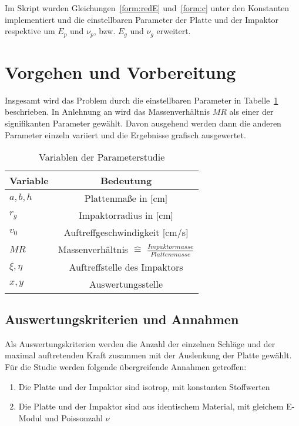 Im Skript wurden Gleichungen~\ref{form:redE} und~\ref{form:c} unter den Konstanten implementiert und die einstellbaren Parameter der Platte und der Impaktor respektive um $E_{p}$ und $\nu_{p}$, bzw. $E_{g}$ und $\nu_{g}$ erweitert.\\

\section{Vorgehen und Vorbereitung}

Insgesamt wird das Problem durch die einstellbaren Parameter in Tabelle~\ref{tab:VariablenderStudie} beschrieben. In Anlehnung an \cite{Olsson.2000} wird das Massenverhältnis $MR$ als einer der signifikanten Parameter gewählt. Davon ausgehend werden dann die anderen Parameter einzeln variiert und die Ergebnisse grafisch ausgewertet. 

\begin{table}[H]
	\begin{center}
		\caption{Variablen der Parameterstudie}
		\label{tab:VariablenderStudie}
		\begin{tabular}{l|c}
			\textbf{Variable} & \textbf{Bedeutung}\\
			\hline
			$a,b,h$ & Plattenmaße in [cm]\\
			$r_{g}$ & Impaktorradius in [cm]\\
			$v_{0}$ & Auftreffgeschwindigkeit [cm/s]\\
			$MR$ & Massenverhältnis $\hat{=}$ $\frac{Impaktormasse}{Plattenmasse}$\\
			$\xi,\eta$ & Auftreffstelle des Impaktors\\
			$x,y$ & Auswertungsstelle\\		
		\end{tabular}
	\end{center}
\end{table}

\subsection{Auswertungskriterien und Annahmen}

Als Auswertungskriterien werden die Anzahl der einzelnen Schläge und der maximal auftretenden Kraft zusammen mit der Auslenkung der Platte gewählt. \\
Für die Studie werden folgende übergreifende Annahmen getroffen: 

\begin{enumerate}
	\item{Die Platte und der Impaktor sind isotrop, mit konstanten Stoffwerten}
	\item{Die Platte und der Impaktor sind aus identischem Material, mit gleichem E-Modul und Poissonzahl $\nu$}
\end{enumerate}

